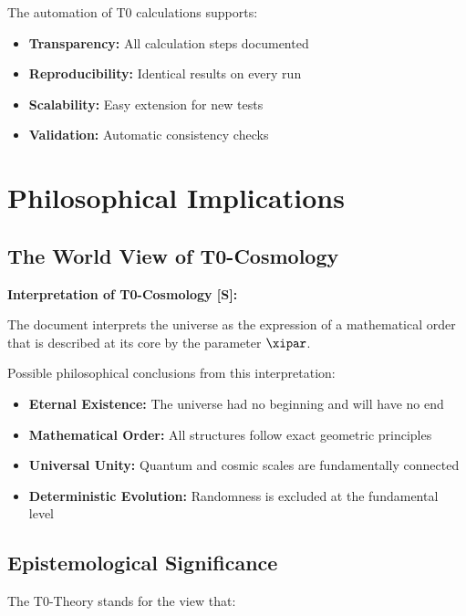 	The automation of T0 calculations supports:
	
	\begin{itemize}
		\item \textbf{Transparency:} All calculation steps documented
		\item \textbf{Reproducibility:} Identical results on every run
		\item \textbf{Scalability:} Easy extension for new tests
		\item \textbf{Validation:} Automatic consistency checks
	\end{itemize}
	
	\section{Philosophical Implications}
	
	\subsection{The World View of T0-Cosmology}
	
	\begin{revolutionary}
		\textbf{Interpretation of T0-Cosmology [S]:}
		
		The document interprets the universe as the expression of a mathematical order that is described at its core by the parameter $\xipar$.
	\end{revolutionary}
	
	Possible philosophical conclusions from this interpretation:
	
	\begin{itemize}
		\item \textbf{Eternal Existence:} The universe had no beginning and will have no end
		\item \textbf{Mathematical Order:} All structures follow exact geometric principles
		\item \textbf{Universal Unity:} Quantum and cosmic scales are fundamentally connected
		\item \textbf{Deterministic Evolution:} Randomness is excluded at the fundamental level
	\end{itemize}
	
	\subsection{Epistemological Significance}
	
	The T0-Theory stands for the view that:
	
